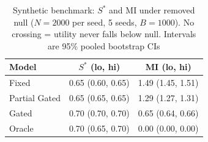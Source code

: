 \begin{table}[tb]
\centering
\caption{Synthetic benchmark: $S^*$ and MI under removed null ($N=2000$ per seed, 5 seeds, $B=1000$). No crossing = utility never falls below null. Intervals are 95\% pooled bootstrap CIs}
\label{tab:synthetic-summary}
{\footnotesize\setlength{\tabcolsep}{3pt}%
\begin{tabular}{lcc}
\toprule
\textbf{Model} & $S^{*}$ (lo, hi) & MI (lo, hi) \\
\midrule
Fixed        & 0.65 (0.60, 0.65) & 1.49 (1.45, 1.51) \\
Partial Gated & 0.65 (0.65, 0.65) & 1.29 (1.27, 1.31) \\
Gated        & 0.70 (0.70, 0.70) & 0.65 (0.64, 0.66) \\
Oracle       & 0.70 (0.65, 0.70) & 0.00 (0.00, 0.00) \\
\bottomrule
\end{tabular}}
\end{table}
